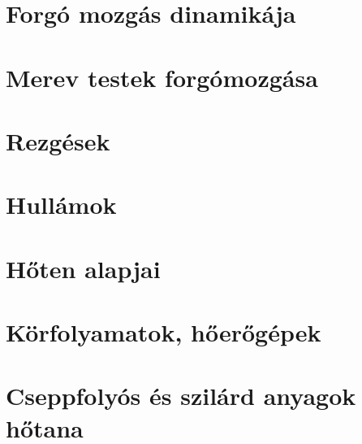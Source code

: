 \documentclass[10pt]{article}
\begin{document}

	\section{Forgó mozgás dinamikája}


	\section{Merev testek forgómozgása}


	\section{Rezgések}

	\section{Hullámok}

	\section{Hőten alapjai}

	\section{Körfolyamatok, hőerőgépek}

	\section{Cseppfolyós és szilárd anyagok hőtana}
\end{document}

